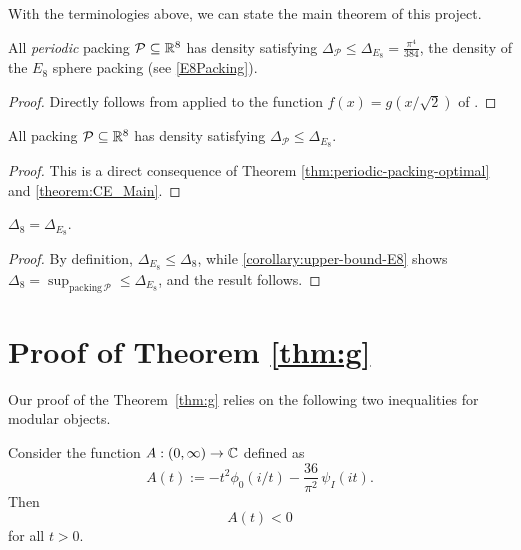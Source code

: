 With the terminologies above, we can state the main theorem of this project.

\begin{theorem}\label{theorem:CE_Main}
  All \emph{periodic} packing $\mathcal{P} \subseteq \mathbb{R}^8$ has density satisfying $\Delta_{\mathcal{P}} \leq \Delta_{E_8} = \frac{\pi^4}{384}$, the density of the $E_8$ sphere packing (see \cref{E8Packing}).
\end{theorem}
\begin{proof}
  Directly follows from  applied to the function $f(x)=g(x/\sqrt{2})$ of .
\end{proof}

\begin{corollary}\label{corollary:upper-bound-E8}
  All packing $\mathcal{P} \subseteq \mathbb{R}^8$ has density satisfying $\Delta_{\mathcal{P}} \leq \Delta_{E_8}$.
\end{corollary}
\begin{proof}
  This is a direct consequence of Theorem \cref{thm:periodic-packing-optimal} and \cref{theorem:CE_Main}.
\end{proof}

\begin{corollary}\label{MainTheorem}
  $\Delta_8 = \Delta_{E_8}$.
\end{corollary}
\begin{proof}
  By definition, $\Delta_{E_8} \leq \Delta_8$, while \cref{corollary:upper-bound-E8} shows $\Delta_8 = \sup_{\mathrm{packing} \, \mathcal{P}} \leq \Delta_{E_8}$, and the result follows.
\end{proof}


\section{Proof of Theorem \ref{thm:g}}\label{sec: g}
Our proof of the Theorem~\ref{thm:g} relies on the following two inequalities for modular objects.
\begin{proposition}\label{prop:ineqA}\leanok
Consider the function $A:(0,\infty)\to\mathbb{C}$ defined as
\begin{equation}\label{eqn:defA}
A(t):=-t^2\phi_0(i/t)-\frac{36}{\pi^2}\,\psi_I(it).
\end{equation}
Then
\begin{equation}\label{eqn:ineqA}
    A(t) < 0
\end{equation}
for all $t > 0$.
\end{proposition}

